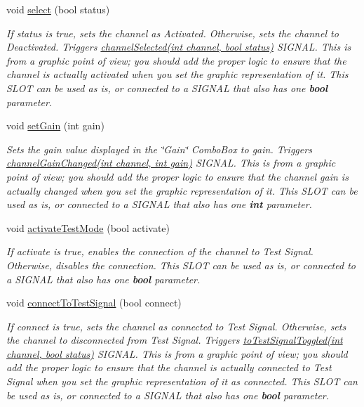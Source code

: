\begin{DoxyCompactItemize}
\item 
void \hyperlink{classChannelLayout_a9a030de719c4df6b68a0dcb5ea733f0e}{select} (bool status)
\begin{DoxyCompactList}\small\item\em If {\itshape status} is true, sets the channel as Activated. Otherwise, sets the channel to Deactivated. Triggers \hyperlink{classChannelLayout_a2a9870b08695ba89559f5fc29628d018}{channel\+Selected(int channel, bool status)} S\+I\+G\+N\+A\+L. This is from a graphic point of view; you should add the proper logic to ensure that the channel is actually activated when you set the graphic representation of it. This S\+L\+O\+T can be used as is, or connected to a S\+I\+G\+N\+A\+L that also has one {\bfseries bool} parameter. \end{DoxyCompactList}\item 
void \hyperlink{classChannelLayout_a79f01917e46190d8e7e1cfaeb66b5334}{set\+Gain} (int gain)
\begin{DoxyCompactList}\small\item\em Sets the gain value displayed in the \char`\"{}\+Gain\char`\"{} Combo\+Box to {\itshape gain}. Triggers \hyperlink{classChannelLayout_a12fa160d0f7b87c66d0e08e6f0abc996}{channel\+Gain\+Changed(int channel, int gain)} S\+I\+G\+N\+A\+L. This is from a graphic point of view; you should add the proper logic to ensure that the channel gain is actually changed when you set the graphic representation of it. This S\+L\+O\+T can be used as is, or connected to a S\+I\+G\+N\+A\+L that also has one {\bfseries int} parameter. \end{DoxyCompactList}\item 
void \hyperlink{classChannelLayout_a2fc7025ace239041152a6b7f01141e55}{activate\+Test\+Mode} (bool activate)
\begin{DoxyCompactList}\small\item\em If {\itshape activate} is true, enables the connection of the channel to Test Signal. Otherwise, disables the connection. This S\+L\+O\+T can be used as is, or connected to a S\+I\+G\+N\+A\+L that also has one {\bfseries bool} parameter. \end{DoxyCompactList}\item 
void \hyperlink{classChannelLayout_a05f0a5b58375512683943c5aa92dc75c}{connect\+To\+Test\+Signal} (bool connect)
\begin{DoxyCompactList}\small\item\em If {\itshape connect} is true, sets the channel as connected to Test Signal. Otherwise, sets the channel to disconnected from Test Signal. Triggers \hyperlink{classChannelLayout_ac515619c820628a614d25802f7ebde23}{to\+Test\+Signal\+Toggled(int channel, bool status)} S\+I\+G\+N\+A\+L. This is from a graphic point of view; you should add the proper logic to ensure that the channel is actually connected to Test Signal when you set the graphic representation of it as connected. This S\+L\+O\+T can be used as is, or connected to a S\+I\+G\+N\+A\+L that also has one {\bfseries bool} parameter. \end{DoxyCompactList}\item 

\end{DoxyCompactItemize}
